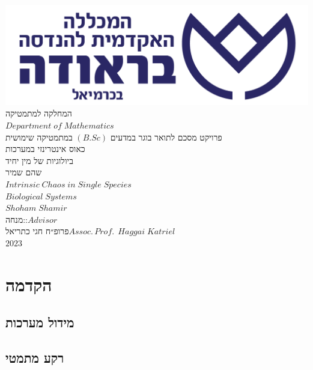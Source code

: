 \documentclass{report}
\begin{document}
\begin{center}
    \includegraphics[scale=0.15]{figs/braude.png}\\\smallskip
    \textcolor{braude}{המחלקה למתמטיקה\\\vspace{1.5mm}\(Department\;of\;Mathematics\)}\\\vspace{20mm}
    {\large פרויקט מסכם לתואר בוגר במדעים \(\left(B.Sc\right)\) במתמטיקה שימושית}\\\vspace{23mm}
    {\LARGE כאוס אינטרינזי במערכות\\ביולוגיות של מין יחיד}\\\medskip
    {\large שהם שמיר}\\\vspace{9mm}
    {\LARGE \(Intrinsic\;Chaos\;in\;Single\;Species\)\\\(Biological\;Systems\)}\\\medskip
    {\large  \(Shoham\;Shamir\)}\\\vspace{30mm}
    מנחה:\hfill :\(Advisor\)\\
    פרופ״ח חגי כתריאל\hfill \(Assoc.\,Prof.\:\:Haggai\;Katriel\)\\\vfill
    \(2023\)
\end{center}
\thispagestyle{empty}
\newpage
{}\setcounter{page}{1}

\newpage

\tableofcontents
\listoffigures
\newpage
{}\setcounter{page}{1}
\part{הקדמה}
\chapter{מידול מערכות}
\chapter{רקע מתמטי}
\end{document}
